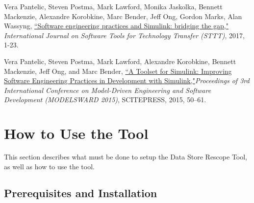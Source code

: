 \documentclass{article}
\makeatletter
\newcommand{\ToolName}{Data Store Rescope Tool\@\xspace}
\makeatother
\begin{document}
\vspace{1em}
Vera Pantelic, Steven Postma, Mark Lawford, Monika Jaskolka, Bennett Mackenzie, Alexandre Korobkine, Marc Bender, Jeff Ong, Gordon Marks, Alan Wassyng, \href{https://link.springer.com/article/10.1007/s10009-017-0450-9}{``Software engineering practices and Simulink: bridging the gap,"} \textit{International Journal on Software Tools for Technology Transfer (STTT)}, 2017, 1-23.

\vspace{1em}
Vera Pantelic, Steven Postma, Mark Lawford, Alexandre Korobkine, Bennett Mackenzie, Jeff Ong, and Marc Bender, \href{http://www.cas.mcmaster.ca/~lawford/papers/MODELSWARD2015.pdf}{``A Toolset for Simulink: Improving Software Engineering Practices in Development with Simulink,"}\textit{Proceedings of 3rd International Conference on Model-Driven Engineering and Software Development (MODELSWARD 2015)}, SCITEPRESS, 2015, 50--61.

\newpage
\section{How to Use the Tool}
This section describes what must be done to setup the \ToolName, as well as how to use the tool.

\subsection{Prerequisites and Installation}
\end{document}
